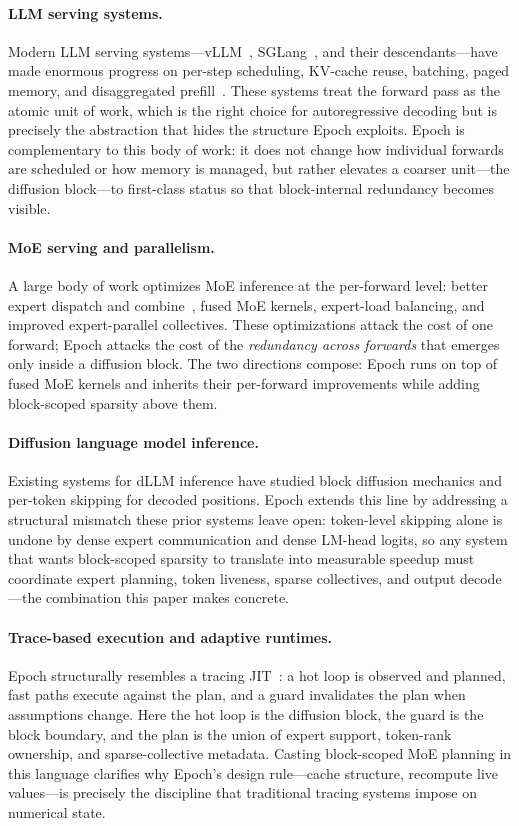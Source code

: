 \documentclass[sigconf,review,anonymous, 10pt]{acmart}
\newcommand{\sys}{Epoch}
\begin{document}
\paragraph{LLM serving systems.}
Modern LLM serving systems---vLLM~\cite{vllm}, SGLang~\cite{sglang}, and their descendants---have made enormous progress on per-step scheduling, KV-cache reuse, batching, paged memory, and disaggregated prefill~\cite{prefill-service}.
These systems treat the forward pass as the atomic unit of work, which is the right choice for autoregressive decoding but is precisely the abstraction that hides the structure \sys{} exploits.
\sys{} is complementary to this body of work: it does not change how individual forwards are scheduled or how memory is managed, but rather elevates a coarser unit---the diffusion block---to first-class status so that block-internal redundancy becomes visible.

\paragraph{MoE serving and parallelism.}
A large body of work optimizes MoE inference at the per-forward level: better expert dispatch and combine~\cite{moe}, fused MoE kernels, expert-load balancing, and improved expert-parallel collectives.
These optimizations attack the cost of one forward; \sys{} attacks the cost of the \emph{redundancy across forwards} that emerges only inside a diffusion block.
The two directions compose: \sys{} runs on top of fused MoE kernels and inherits their per-forward improvements while adding block-scoped sparsity above them.

\paragraph{Diffusion language model inference.}
Existing systems for dLLM inference have studied block diffusion mechanics and per-token skipping for decoded positions.
\sys{} extends this line by addressing a structural mismatch these prior systems leave open: token-level skipping alone is undone by dense expert communication and dense LM-head logits, so any system that wants block-scoped sparsity to translate into measurable speedup must coordinate expert planning, token liveness, sparse collectives, and output decode---the combination this paper makes concrete.

\paragraph{Trace-based execution and adaptive runtimes.}
\sys{} structurally resembles a tracing JIT~\cite{flashattention}: a hot loop is observed and planned, fast paths execute against the plan, and a guard invalidates the plan when assumptions change.
Here the hot loop is the diffusion block, the guard is the block boundary, and the plan is the union of expert support, token-rank ownership, and sparse-collective metadata.
Casting block-scoped MoE planning in this language clarifies why \sys{}'s design rule---cache structure, recompute live values---is precisely the discipline that traditional tracing systems impose on numerical state.
\end{document}
